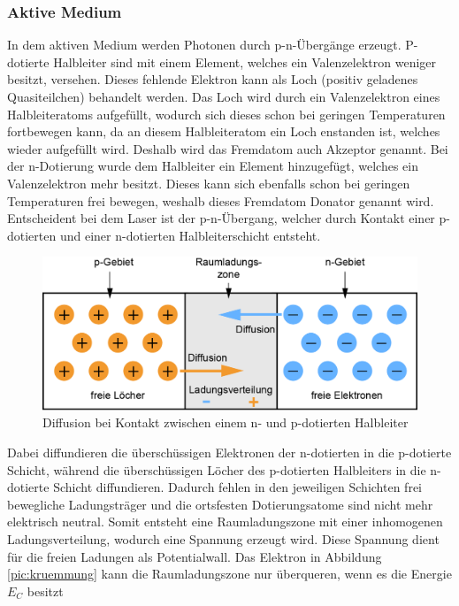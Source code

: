 \subsubsection{Aktive Medium}
\label{subsubsec:aktivesMedium}
In dem aktiven Medium werden Photonen durch p-n-Übergänge erzeugt. P-dotierte Halbleiter sind mit einem Element, welches ein Valenzelektron weniger besitzt, versehen. 
Dieses fehlende Elektron kann als Loch (positiv geladenes Quasiteilchen) behandelt werden.
Das Loch wird durch ein Valenzelektron eines Halbleiteratoms aufgefüllt, wodurch sich dieses schon bei geringen Temperaturen fortbewegen kann, da an diesem Halbleiteratom ein Loch enstanden ist,
welches wieder aufgefüllt wird. Deshalb wird das Fremdatom auch Akzeptor genannt.
Bei der n-Dotierung wurde dem Halbleiter ein Element hinzugefügt, welches ein Valenzelektron mehr besitzt. Dieses kann sich ebenfalls schon bei geringen Temperaturen frei bewegen,
weshalb dieses Fremdatom Donator genannt wird.
Entscheident bei dem Laser ist der p-n-Übergang, welcher durch Kontakt einer p-dotierten und einer n-dotierten Halbleiterschicht entsteht.
\begin{figure}
    \centering
    \includegraphics{pictures/p-n-uebergang}
    \caption{Diffusion bei Kontakt zwischen einem n- und p-dotierten Halbleiter\cite{p-n-uebergang}}
    \label{pic:diffusion}
\end{figure}
Dabei diffundieren die überschüssigen Elektronen der n-dotierten in die p-dotierte Schicht, während die überschüssigen Löcher des p-dotierten Halbleiters in die n-dotierte
Schicht diffundieren.
Dadurch fehlen in den jeweiligen Schichten frei bewegliche Ladungsträger und die ortsfesten Dotierungsatome sind nicht mehr elektrisch neutral.  
Somit entsteht eine Raumladungszone mit einer inhomogenen Ladungsverteilung, wodurch eine Spannung erzeugt wird.
Diese Spannung dient für die freien Ladungen als Potentialwall. Das Elektron in Abbildung \ref{pic:kruemmung} kann die Raumladungszone nur überqueren, wenn es die Energie $E_C$ besitzt
